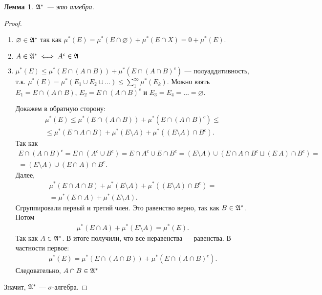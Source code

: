 \documentclass[a4paper,14pt]{extarticle}
\newcounter{theoremCnt}
\theoremstyle{definition}
\theoremstyle{plain}
\theoremstyle{plain}
\newtheorem{lm}[theoremCnt]{Лемма}
\theoremstyle{plain}
\theoremstyle{plain}
\theoremstyle{definition}
\theoremstyle{definition}
\theoremstyle{definition}
\theoremstyle{definition}
\theoremstyle{definition}
\theoremstyle{definition}
\theoremstyle{plain}
\theoremstyle{plain}
\theoremstyle{plain}
\theoremstyle{plain}
\theoremstyle{definition}
\theoremstyle{definition}
\theoremstyle{definition}
\theoremstyle{definition}
\theoremstyle{definition}
\newcommand{\A}{\ensuremath \mathfrak{A}}
\begin{document}
\begin{lm}
 $ \A^\ast $ --- это алгебра.
\end{lm}
\begin{proof}\
 \begin{enumerate}
  \item $ \varnothing \in \A^\ast $ так как $ \mu^\ast(E) = \mu^\ast(E \cap \varnothing) + \mu^\ast(E \cap X) = 0 + \mu^\ast(E) $.
  \setcounter{enumi}{2}
  \item $ A \in \A^\ast \iff A^c \in \A $
  \setcounter{enumi}{1}
  \item $ \mu^\ast(E) \leqslant \mu^\ast(E \cap (A \cap B)) + \mu^\ast(E \cap (A \cap B)^c) $ --- полуаддитивность, т.к. $ \mu^\ast(E) = \mu^\ast(E_1 \cup E_2 \cup \ldots) \leqslant \sum_1^\infty \mu^\ast(E_k)$. Можно взять $ E_1 = E \cap (A \cap B) $, $ E_2 = E \cap (A \cap B)^c $ и $ E_3 = E_4 = \ldots = \varnothing $.

  Докажем в обратную сторону:
  \begin{align*}
   \mu^\ast(E) \leqslant \mu^\ast(E \cap (A \cap B)) + \mu^\ast(E \cap (A \cap B)^c) \leqslant \\
   \leqslant \mu^\ast(E \cap A \cap B) + \mu^\ast(E \setminus A) + \mu^\ast((E \setminus A) \cap B^c)
   .\end{align*} Так как
  \begin{align*}
   E \cap (A \cap B)^c = E \cap (A^c \cup B^c) = E \cap A^c \cup E \cap B^c = (E \setminus A) \cup (E \cap A \cap B^c \sqcup (E \ A) \cap B^c) = \\
   = (E \setminus A) \cup (E \cap A) \cap B^c
   .\end{align*} Далее,
  \begin{align*}
   \mu^\ast(E \cap A \cap B) + \mu^\ast(E \setminus A) + \mu^\ast((E \setminus A) \cap B^c) = \\
   = \mu^\ast(E \cap A) + \mu^\ast(E \setminus A)
   .\end{align*} Сгруппировали первый и третий член. Это равенство верно, так как $ B \in \A^\ast $. Потом
  \begin{align*}
   \mu^\ast(E \cap A) + \mu^\ast(E \setminus A) = \mu^\ast(E)
   .\end{align*} Так как $ A \in \A^\ast $. В итоге получили, что все неравенства --- равенства. В частности первое:
  \begin{align*}
   \mu^\ast(E) = \mu^\ast(E \cap (A \cap B)) + \mu^\ast(E \cap (A \cap B)^c)
   .\end{align*} Следовательно, $ A \cap B \in \A^\ast $
 \end{enumerate}
 Значит, $ \A^\ast $ --- $ \sigma $-алгебра.
\end{proof}
\end{document}
